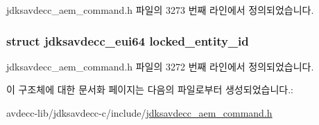jdksavdecc\+\_\+aem\+\_\+command.\+h 파일의 3273 번째 라인에서 정의되었습니다.

\subsubsection[{\texorpdfstring{locked\+\_\+entity\+\_\+id}{locked_entity_id}}]{\setlength{\rightskip}{0pt plus 5cm}struct {\bf jdksavdecc\+\_\+eui64} locked\+\_\+entity\+\_\+id}\hypertarget{structjdksavdecc__aem__command__lock__entity_a397afd1623d57ce0b39e414e537ee497}{}\label{structjdksavdecc__aem__command__lock__entity_a397afd1623d57ce0b39e414e537ee497}


jdksavdecc\+\_\+aem\+\_\+command.\+h 파일의 3272 번째 라인에서 정의되었습니다.



이 구조체에 대한 문서화 페이지는 다음의 파일로부터 생성되었습니다.\+:\begin{DoxyCompactItemize}
\item 
avdecc-\/lib/jdksavdecc-\/c/include/\hyperlink{jdksavdecc__aem__command_8h}{jdksavdecc\+\_\+aem\+\_\+command.\+h}\end{DoxyCompactItemize}

